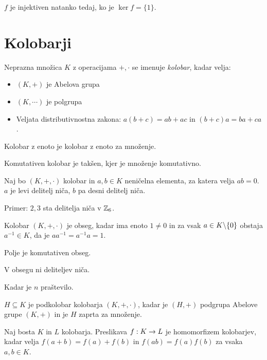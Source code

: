 $f$ je injektiven natanko tedaj, ko je $\ker f = \{1\}$.

\section{Kolobarji}


Neprazna množica $K$ z operacijama $+, \cdot$ se imenuje \textit{kolobar}, kadar velja:
\begin{itemize}
	\item $(K, +)$ je Abelova grupa
	\item $(K, \cdots)$ je polgrupa
	\item Veljata distributivnostna zakona: $a(b+c) = ab+ac$ in $(b+c)a = ba + ca$.
\end{itemize}


Kolobar z enoto je kolobar z enoto za množenje.

Komutativen kolobar je takšen, kjer je množenje komutativno.


Naj bo $(K, +, \cdot)$ kolobar in $a, b \in K$ neničelna elementa, za katera velja $ab = 0$. $a$ je levi delitelj niča, $b$ pa desni delitelj niča.

Primer: $2, 3$ sta delitelja niča v $\mathbb{Z}_6$.


Kolobar $(K, +, \cdot)$ je obseg, kadar ima enoto $1 \ne 0$ in za vsak $a \in K \backslash \{0\}$ obstaja $a^{-1} \in K$, da je $aa^{-1} = a^{-1}a = 1$.

Polje je komutativen obseg.

V obsegu ni deliteljev niča.


Kadar je $n$ praštevilo.


$H \subseteq K$ je podkolobar kolobarja $(K, +, \cdot)$, kadar je $(H,+)$ podgrupa Abelove grupe $(K, +)$ in je $H$ zaprta za množenje.


Naj bosta $K$ in $L$ kolobarja. Preslikava $f: K \to L$ je homomorfizem kolobarjev, kadar velja $f(a+b) = f(a)+f(b)$ in $f(ab) = f(a)f(b)$ za vsaka $a, b \in K$.

